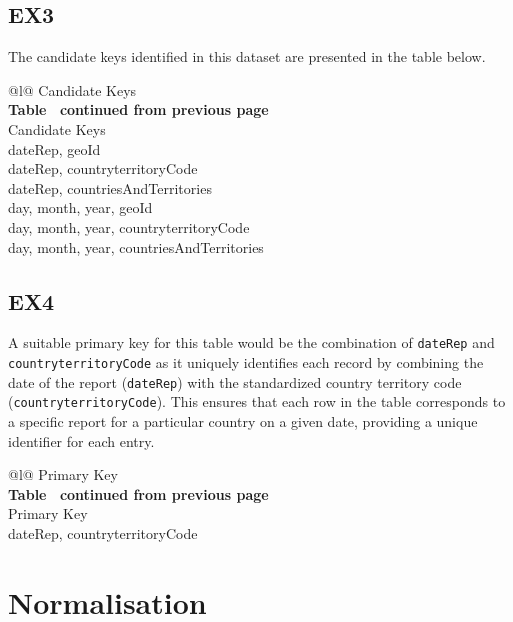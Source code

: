 \documentclass[]{article}
\begin{document}
\subsection{EX3}
The candidate keys identified in this dataset are presented in the table below.
\begin{longtable}[c]{@{}l@{}}
\toprule
Candidate Keys                            \\* \midrule
\endfirsthead
%
\multicolumn{1}{c}%
{{\bfseries Table \thetable\ continued from previous page}} \\
\toprule
Candidate Keys                            \\* \midrule
\endhead
%
\bottomrule
\endfoot
%
\endlastfoot
%
dateRep, geoId                            \\
dateRep, countryterritoryCode             \\
dateRep, countriesAndTerritories          \\
day, month, year, geoId                   \\
day, month, year, countryterritoryCode    \\
day, month, year, countriesAndTerritories \\* \bottomrule
\end{longtable}
\subsection{EX4}
A suitable primary key for this table would be the combination of \verb|dateRep| and \verb|countryterritoryCode| as it uniquely identifies each record by combining the date of the report (\verb|dateRep|) with the standardized country territory code (\verb|countryterritoryCode|). This ensures that each row in the table corresponds to a specific report for a particular country on a given date, providing a unique identifier for each entry.
\begin{longtable}[c]{@{}l@{}}
\toprule
Primary Key                   \\* \midrule
\endfirsthead
%
\multicolumn{1}{c}%
{{\bfseries Table \thetable\ continued from previous page}} \\
\toprule
Primary Key                   \\* \midrule
\endhead
%
dateRep, countryterritoryCode \\* \bottomrule
\end{longtable}
\section{Normalisation}
\end{document}
